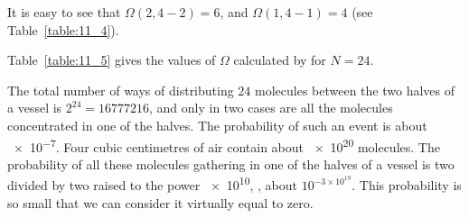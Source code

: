 \noindent
It is easy to see that $\Omega(2, 4-2)=6$, and $\Omega(1, 4-1)=4$ (see Table~\ref{table:11_4}).

Table~\ref{table:11_5} gives the values of $\Omega$ calculated by  for $N=24$.

\begin{table}[!b]
	\renewcommand{\arraystretch}{1.2}
	\caption{ }
	\vspace{-0.6cm}
	\label{table:11_5}
	\begin{center}\end{center}
\end{table}

The total number of ways of distributing $24$ molecules between the two halves of a vessel is $2^{24}=16777216$, and only in two cases are all the molecules concentrated in one of the halves. The probability of such an event is about \num{e-7}. Four cubic centimetres of air contain about \num{e20} molecules. The probability of all these molecules gathering in one of the halves of a vessel is two divided by two raised to the power \num{e10}, \ie, about $10^{-3\times10^{19}}$. This probability is so small that we can consider it virtually equal to zero.

